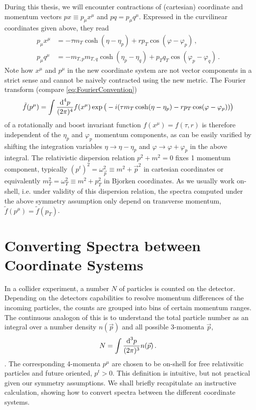 During this thesis, we will encounter contractions of (cartesian) coordinate and momentum vectors ${px\equiv p_\mu x^\mu}$ and ${pq=p_\mu q^\mu}$. Expressed in the curvilinear coordinates given above, they read
\begin{subequations}
    \begin{align}
        p_\mu x^\mu&=-\tau m_T\cosh(\eta-\eta_p)+rp_T\cos(\varphi-\varphi_p)\,,\label{eq:px_contraction}\\
        p_\mu q^\mu&=-m_{T,p}m_{T,q}\cosh(\eta_p-\eta_q)+p_Tq_T\cos(\varphi_p-\varphi_q)\,.\label{eq:pq_contraction}
    \end{align}
    \label{eq:pxpq_contractions}
\end{subequations}
Note how $x^\mu$ and $p^\mu$ in the new coordinate system are not vector components in a strict sense and cannot be naively contracted using the new metric. The Fourier transform (compare \eqref{eq:FourierConvention})
\begin{equation}
    \tilde{f}(p^\mu)=\int\frac{\text{d}^4p}{(2\pi)^4}f(x^\mu)\exp\big(-{i}(\tau m_T\cosh(\eta-\eta_p)-rp_T\cos(\varphi-\varphi_p))\big)
\end{equation}
of a rotationally and boost invariant function ${f(x^\mu)=f(\tau,r)}$ is therefore independent of the $\eta_p$ and $\varphi_p$ momentum components, as can be easily varified by shifting the integration variables ${\eta\to\eta-\eta_p}$ and ${\varphi\to\varphi+\varphi_p}$ in the above integral. The relativistic dispersion relation ${p^2+m^2=0}$ fixes 1 momentum component, typically ${(p^t)^2=\omega_{\vec{p}}^2\equiv m^2+\vec{p}^2}$ in cartesian coordinates or equivalently ${m_T^2=\omega_T^2\equiv m^2+p_T^2}$ in Bjorken coordinates. As we usually work on-shell, i.e. under validity of this dispersion relation, the spectra computed under the above symmetry assumption only depend on transverse momentum, ${\tilde{f}(p^\mu)=\tilde{f}(p_T)}$.



\section{Converting Spectra between Coordinate Systems}
\label{sec:SpectraCoordinateSystem}

In a collider experiment, a number $N$ of particles is counted on the detector. Depending on the detectors capabilities to resolve momentum differences of the incoming particles, the counts are grouped into bins of certain momentum ranges. The continuous analogon of this is to understand the total particle number as an integral over a number density $n(\vec{p})$ and all possible 3-momenta $\vec{p}$,
\begin{equation}
    N=\int\frac{\text{d}^3p}{(2\pi)^3}n(\vec{p})\,.
    \label{eq:NumberDensity_Cartesian}
\end{equation}.
The corresponding 4-momenta $p^\mu$ are chosen to be on-shell for free relativsitic particles and future oriented, $p^t>0$. This definition is intuitive, but not practical given our symmetry assumptions. We shall briefly recapitulate an instructive calculation, showing how to convert spectra between the different coordinate systems.

